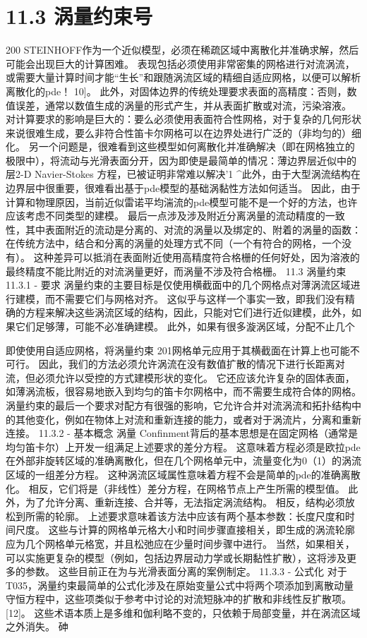 \documentclass[UTF8,11pt,a4paper,openany,fontset=fandol]{ctexbook}
\begin{document}
\section{11.3 涡量约束号}
200 STEINHOFF作为一个近似模型，必须在稀疏区域中离散化并准确求解，然后可能会出现巨大的计算困难。 表现包括必须使用非常密集的网格进行对流涡流，或需要大量计算时间才能“生长”和跟随涡流区域的精细自适应网格，以便可以解析离散化的pde！ 10]。 此外，对固体边界的传统处理要求表面的高精度：否则，数值误差，通常以数值生成的涡量的形式产生，并从表面扩散或对流，污染溶液。 对计算要求的影响是巨大的：要么必须使用表面符合性网格，对于复杂的几何形状来说很难生成，要么非符合性笛卡尔网格可以在边界处进行广泛的（非均匀的）细化。 另一个问题是，很难看到这些模型如何离散化并准确解决（即在网格独立的极限中），将流动与光滑表面分开，因为即使是最简单的情况：薄边界层近似中的层2-D Navier-Stokes 方程，已被证明非常难以解决'1 \textasciicircum{}此外，由于大型涡流结构在边界层中很重要，很难看出基于pde模型的基础涡黏性方法如何适当。 因此，由于计算和物理原因，当前近似雷诺平均湍流的pde模型可能不是一个好的方法，也许应该考虑不同类型的建模。 最后一点涉及涉及附近分离涡量的流动精度的一致性，其中表面附近的流动是分离的、对流的涡量以及绑定的、附着的涡量的函数：在传统方法中，结合和分离的涡量的处理方式不同（一个有符合的网格，一个没有）。 这种差异可以抵消在表面附近使用高精度符合格栅的任何好处，因为溶液的最终精度不能比附近的对流涡量更好，而涡量不涉及符合格栅。 11.3 涡量约束 11.3.1 - 要求 涡量约束的主要目标是仅使用横截面中的几个网格点对薄涡流区域进行建模，而不需要它们与网格对齐。 这似乎与这样一个事实一致，即我们没有精确的方程来解决这些涡流区域的结构，因此，只能对它们进行近似建模，此外，如果它们足够薄，可能不必准确建模。 此外，如果有很多漩涡区域，分配不止几个

即使使用自适应网格，将涡量约束 201网格单元应用于其横截面在计算上也可能不可行。 因此，我们的方法必须允许涡流在没有数值扩散的情况下进行长距离对流，但必须允许以受控的方式建模形状的变化。 它还应该允许复杂的固体表面，如薄涡流板，很容易地嵌入到均匀的笛卡尔网格中，而不需要生成符合体的网格。 涡量约束的最后一个要求对配方有很强的影响，它允许合并对流涡流和拓扑结构中的其他变化，例如在物体上对流和重新连接的能力，或者对于涡流片，分离和重新连接。 11.3.2 - 基本概念 涡量 Confinment背后的基本思想是在固定网格（通常是均匀笛卡尔）上开发一组满足上述要求的差分方程。 这意味着方程必须是欧拉pde在外部非旋转区域的准确离散化，但在几个网格单元中，流量变化为0（1）的涡流区域的一组差分方程。 这种涡流区域属性意味着方程不会是简单的pde的准确离散化。 相反，它们将是（非线性）差分方程，在网格节点上产生所需的模型值。 此外，为了允许分离、重新连接、合并等，无法指定涡流结构。 相反，结构必须放松到所需的轮廓。 上述要求意味着该方法中应该有两个基本参数：长度尺度和时间尺度。 这些与计算的网格单元格大小和时间步骤直接相关，即生成的涡流轮廓应为几个网格单元格宽，并且松弛应在少量时间步骤中进行。 当然，如果相关，可以实施更复杂的模型（例如，包括边界层动力学或长期黏性扩散），这将涉及更多的参数。 这些目前正在为与光滑表面分离的案例制定。 11.3.3 - 公式化 对于T035，涡量约束最简单的公式化涉及在原始变量公式中将两个项添加到离散动量守恒方程中，这些项类似于参考中讨论的对流短脉冲的扩散和非线性反扩散项。 [12]。 这些术语本质上是多维和伽利略不变的，只依赖于局部变量，并在涡流区域之外消失。 砷
\end{document}
